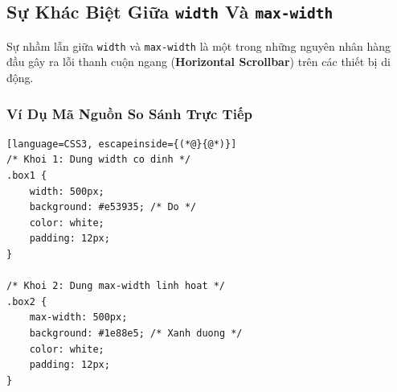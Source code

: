 \documentclass[11pt,oneside]{book}
\newcommand{\thd}[1]{\textcolor{white}{\textbf{\strut #1}}}
\newcommand{\codeinline}[1]{\textcolor{accentOrange}{\texttt{#1}}}
\newcommand{\term}[1]{\textbf{\textcolor{primaryBlue}{#1}}}
\DeclareRobustCommand{\csshint}[1]{\texorpdfstring{\textcolor{accentOrange}{\textbf{\texttt{#1}}}}{#1}}
\begin{document}
\subsection{Sự Khác Biệt Giữa \csshint{width} Và \csshint{max-width}}
\label{subsec:diff_width_vs_max_width}

Sự nhầm lẫn giữa \codeinline{width} và \codeinline{max-width} là một trong những nguyên nhân hàng đầu gây ra lỗi thanh cuộn ngang (\term{Horizontal Scrollbar}) trên các thiết bị di động.

\begin{prettyTableBox}
\sffamily\small
{}
\end{prettyTableBox}

\subsubsection{Ví Dụ Mã Nguồn So Sánh Trực Tiếp}

\begin{codeWindow}
\begin{lstlisting}[language=CSS3, escapeinside={(*@}{@*)}]
/* Khoi 1: Dung width co dinh */
.box1 {
    width: 500px;
    background: #e53935; /* Do */
    color: white;
    padding: 12px;
}

/* Khoi 2: Dung max-width linh hoat */
.box2 {
    max-width: 500px;
    background: #1e88e5; /* Xanh duong */
    color: white;
    padding: 12px;
}
\end{lstlisting}
\end{codeWindow}
\end{document}
